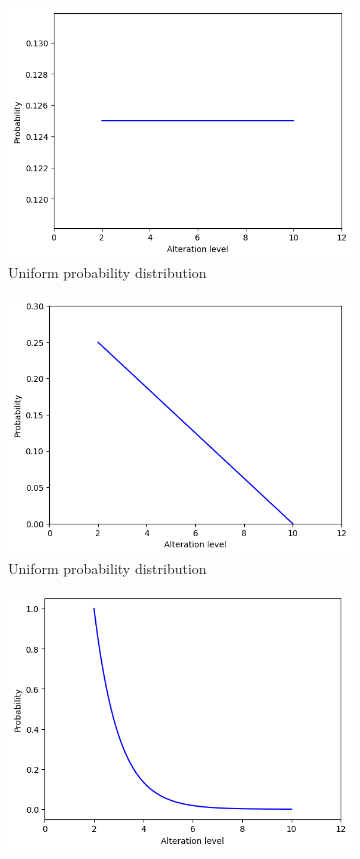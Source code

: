 \begin{figure}[h]
	\centering
	\begin{subfigure}{.33\textwidth}
		\centering
		\includegraphics[width=0.9\linewidth]{ImageFiles/ANNRob/unifo_prob}
		\caption{Uniform probability distribution}
		\label{fig:unifo_prob}
	\end{subfigure}%
	\begin{subfigure}{.33\textwidth}
		\centering
		\includegraphics[width=0.9\linewidth]{ImageFiles/ANNRob/lin_prob}
		\caption{Uniform probability distribution}
		\label{fig:lin_prob}
	\end{subfigure}%
	\begin{subfigure}{.33\textwidth}
		\centering
		\includegraphics[width=0.9\linewidth]{ImageFiles/ANNRob/exp_prob}

\end{subfigure}
\end{figure}
